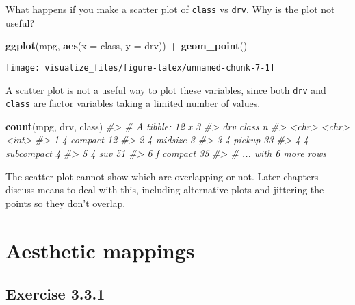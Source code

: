 \documentclass[]{book}
\newenvironment{Shaded}{\begin{snugshade}}{\end{snugshade}}
\newcommand{\CommentTok}[1]{\textcolor[rgb]{0.56,0.35,0.01}{\textit{#1}}}
\newcommand{\DataTypeTok}[1]{\textcolor[rgb]{0.13,0.29,0.53}{#1}}
\newcommand{\KeywordTok}[1]{\textcolor[rgb]{0.13,0.29,0.53}{\textbf{#1}}}
\newcommand{\NormalTok}[1]{#1}
\newcommand{\OperatorTok}[1]{\textcolor[rgb]{0.81,0.36,0.00}{\textbf{#1}}}
\newcommand{\StringTok}[1]{\textcolor[rgb]{0.31,0.60,0.02}{#1}}
\theoremstyle{plain}
\theoremstyle{remark}
\begin{document}
What happens if you make a scatter plot of \texttt{class} vs
\texttt{drv}. Why is the plot not useful?

\begin{Shaded}
\begin{Highlighting}[]
\KeywordTok{ggplot}\NormalTok{(mpg, }\KeywordTok{aes}\NormalTok{(}\DataTypeTok{x =}\NormalTok{ class, }\DataTypeTok{y =}\NormalTok{ drv)) }\OperatorTok{+}
\StringTok{  }\KeywordTok{geom_point}\NormalTok{()}
\end{Highlighting}
\end{Shaded}

\begin{center}\texttt{[image: visualize\_files/figure-latex/unnamed-chunk-7-1]} \end{center}

A scatter plot is not a useful way to plot these variables, since both
\texttt{drv} and \texttt{class} are factor variables taking a limited
number of values.

\begin{Shaded}
\begin{Highlighting}[]
\KeywordTok{count}\NormalTok{(mpg, drv, class)}
\CommentTok{#> # A tibble: 12 x 3}
\CommentTok{#>   drv   class          n}
\CommentTok{#>   <chr> <chr>      <int>}
\CommentTok{#> 1 4     compact       12}
\CommentTok{#> 2 4     midsize        3}
\CommentTok{#> 3 4     pickup        33}
\CommentTok{#> 4 4     subcompact     4}
\CommentTok{#> 5 4     suv           51}
\CommentTok{#> 6 f     compact       35}
\CommentTok{#> # ... with 6 more rows}
\end{Highlighting}
\end{Shaded}

The scatter plot cannot show which are overlapping or not. Later
chapters discuss means to deal with this, including alternative plots
and jittering the points so they don't overlap.

\hypertarget{aesthetic-mappings}{%
\section{Aesthetic mappings}\label{aesthetic-mappings}}

\hypertarget{exercise-3.3.1}{%
\subsection*{\texorpdfstring{Exercise
{3.3.1}}{Exercise 3.3.1}}\label{exercise-3.3.1}}
\end{document}
